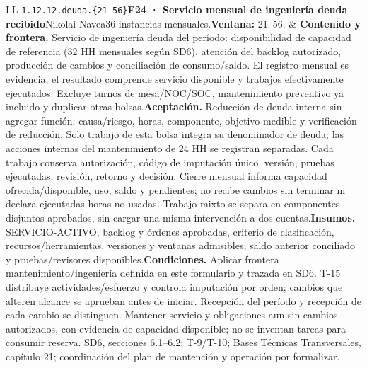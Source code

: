 \begin{longtable}{L{\tabcolsep\relax}L{\tabcolsep\relax}}
\texttt{1.\allowbreak{}12.\allowbreak{}12.\allowbreak{}deuda.\allowbreak{}\{21--56\}}\newline{}\textbf{F24 · Servicio mensual de ingeniería deuda recibido}\newline{}Nikolai Navea\newline{}36 instancias mensuales.\newline{}\textbf{Ventana:} 21--56. & \textbf{Contenido y frontera.} Servicio de ingeniería deuda del período: disponibilidad de capacidad de referencia (32 HH mensuales según SD6), atención del backlog autorizado, producción de cambios y conciliación de consumo/saldo. El registro mensual es evidencia; el resultado comprende servicio disponible y trabajos efectivamente ejecutados. Excluye turnos de mesa/NOC/SOC, mantenimiento preventivo ya incluido y duplicar otras bolsas.\newline{}\textbf{Aceptación.} Reducción de deuda interna sin agregar función: causa/riesgo, horas, componente, objetivo medible y verificación de reducción. Solo trabajo de esta bolsa integra su denominador de deuda; las acciones internas del mantenimiento de 24 HH se registran separadas. Cada trabajo conserva autorización, código de imputación único, versión, pruebas ejecutadas, revisión, retorno y decisión. Cierre mensual informa capacidad ofrecida/disponible, uso, saldo y pendientes; no recibe cambios sin terminar ni declara ejecutadas horas no usadas. Trabajo mixto se separa en componentes disjuntos aprobados, sin cargar una misma intervención a dos cuentas.\newline{}\textbf{Insumos.} SERVICIO-ACTIVO, backlog y órdenes aprobadas, criterio de clasificación, recursos/herramientas, versiones y ventanas admisibles; saldo anterior conciliado y pruebas/revisores disponibles.\newline{}\textbf{Condiciones.} Aplicar frontera mantenimiento/ingeniería definida en este formulario y trazada en SD6. T-15 distribuye actividades/esfuerzo y controla imputación por orden; cambios que alteren alcance se aprueban antes de iniciar. Recepción del período y recepción de cada cambio se distinguen. Mantener servicio y obligaciones aun sin cambios autorizados, con evidencia de capacidad disponible; no se inventan tareas para consumir reserva. SD6, secciones 6.1--6.2; T-9/T-10; Bases Técnicas Transversales, capítulo 21; coordinación del plan de mantención y operación por formalizar.\\\hline

\end{longtable}
